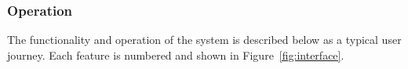 




\subsubsection{Operation}

The functionality and operation of the system is described below as a typical user journey. Each feature is numbered
and shown in Figure~\ref{fig:interface}.

